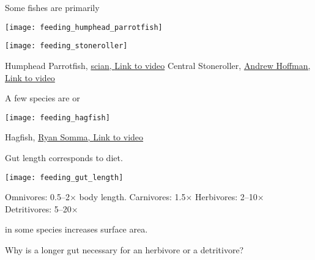 \label{key}\documentclass[t]{beamer}
\begin{document}
\begin{frame}[c,plain]{Some fishes are primarily }


	\begin{multicols}{2}
	
	\texttt{[image: feeding\_humphead\_parrotfish]}
	
	\columnbreak
	
	\texttt{[image: feeding\_stoneroller]}

	\end{multicols}
	
\vfilll

\tiny Humphead Parrotfish, \href{https://www.flickr.com/photos/39582670@N00/2140573088}{scian, } \href{https://www.youtube.com/watch?v=o-blz2ghKOU}{Link to video} 
\hfill
Central Stoneroller, \href{https://www.flickr.com/photos/71701055@N00/8624961462}{Andrew Hoffman, } \href{https://www.youtube.com/watch?v=VyMU2bTZ6JU}{Link to video}
	
	
\end{frame}

\begin{frame}[c,plain]{A few species are  or }


	\texttt{[image: feeding\_hagfish]}
	
	
\vfilll

\tinyfill Hagfish, \href{https://www.flickr.com/photos/14405058@N08/2318155213}{Ryan Somma, } \href{https://www.youtube.com/watch?v=owKFlNU_T5w}{Link to video} 
	
\end{frame}

\begin{frame}[t]{Gut length corresponds to diet.}

\begin{multicols}{2}
\texttt{[image: feeding\_gut\_length]}

\columnbreak

Omnivores: 0.5–2$\times$ body length.\newline
Carnivores: 1.5$\times$ \newline
Herbivores: 2–10$\times$\newline
Detritivores: 5–20$\times$ \vspace*{1\baselineskip}

 in some species increases surface area.\vspace*{1\baselineskip}

Why is a longer gut necessary for an herbivore or a detritivore?
\end{multicols}

\end{frame}
\end{document}
